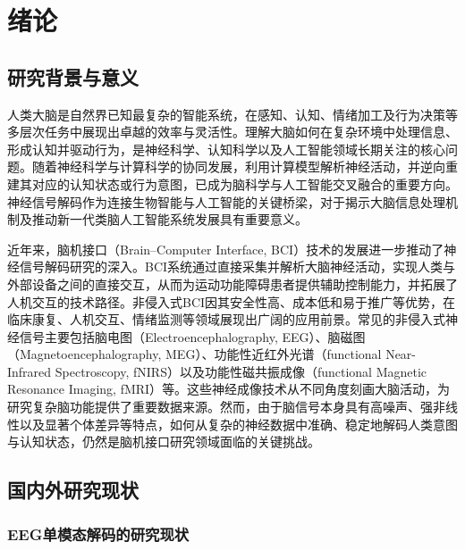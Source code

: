 \chapter{绪论}

\section{研究背景与意义}

人类大脑是自然界已知最复杂的智能系统，在感知、认知、情绪加工及行为决策等多层次任务中展现出卓越的效率与灵活性\citep{hassabis2017neuroscience}。理解大脑如何在复杂环境中处理信息、形成认知并驱动行为，是神经科学、认知科学以及人工智能领域长期关注的核心问题。随着神经科学与计算科学的协同发展，利用计算模型解析神经活动，并逆向重建其对应的认知状态或行为意图，已成为脑科学与人工智能交叉融合的重要方向\citep{haynes2006decoding}。神经信号解码作为连接生物智能与人工智能的关键桥梁\citep{wolpaw2007brain}，对于揭示大脑信息处理机制及推动新一代类脑人工智能系统发展具有重要意义\citep{makeig2012evolving}。

近年来，脑机接口（Brain–Computer Interface, BCI）\citep{gao2021interface}技术的发展进一步推动了神经信号解码研究的深入。BCI系统通过直接采集并解析大脑神经活动，实现人类与外部设备之间的直接交互，从而为运动功能障碍患者提供辅助控制能力，并拓展了人机交互的技术路径\citep{kawala2021summary,gao2025brain}。非侵入式BCI因其安全性高、成本低和易于推广等优势，在临床康复、人机交互、情绪监测等领域展现出广阔的应用前景。常见的非侵入式神经信号主要包括脑电图（Electroencephalography, EEG）\citep{al2018review}、脑磁图（Magnetoencephalography, MEG）\citep{mellinger2007meg, hajipour2012selection}、功能性近红外光谱（functional Near-Infrared Spectroscopy, fNIRS）\citep{shin2020performance, lim2020unified}以及功能性磁共振成像（functional Magnetic Resonance Imaging, fMRI）\citep{yoo2004brain, weiskopf2003physiological}等。这些神经成像技术从不同角度刻画大脑活动，为研究复杂脑功能提供了重要数据来源。然而，由于脑信号本身具有高噪声、强非线性以及显著个体差异等特点，如何从复杂的神经数据中准确、稳定地解码人类意图与认知状态，仍然是脑机接口研究领域面临的关键挑战。

\section{国内外研究现状}

\subsection{EEG单模态解码的研究现状}

